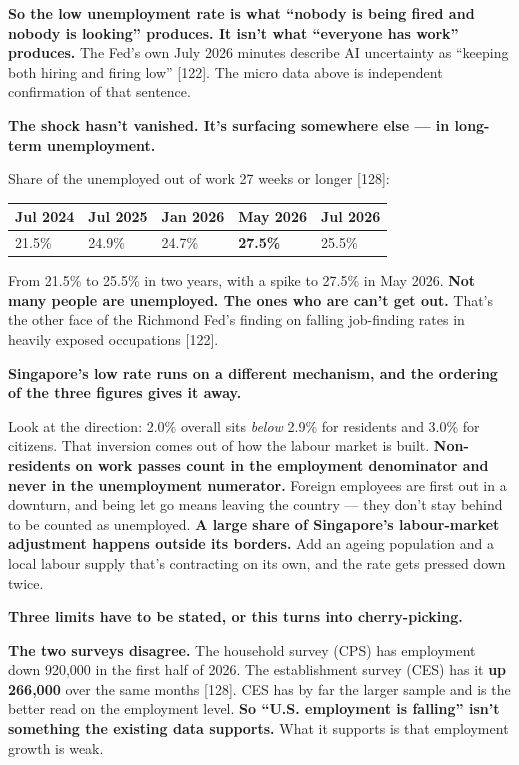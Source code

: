 \documentclass[11pt,a4paper]{article}
\begin{document}
\textbf{So the low unemployment rate is what ``nobody is being fired and nobody is looking'' produces. It isn't what ``everyone has work'' produces.} The Fed's own July 2026 minutes describe AI uncertainty as ``keeping both hiring and firing low'' [122]. The micro data above is independent confirmation of that sentence.

\textbf{The shock hasn't vanished. It's surfacing somewhere else --- in long-term unemployment.}

Share of the unemployed out of work 27 weeks or longer [128]:

\begin{center}
\small
\begin{tabularx}{\textwidth}{lXXXX}
\toprule
Jul 2024 & Jul 2025 & Jan 2026 & May 2026 & Jul 2026 \\
\midrule
21.5\% & 24.9\% & 24.7\% & \textbf{27.5\%} & 25.5\% \\
\bottomrule
\end{tabularx}
\end{center}

From 21.5\% to 25.5\% in two years, with a spike to 27.5\% in May 2026. \textbf{Not many people are unemployed. The ones who are can't get out.} That's the other face of the Richmond Fed's finding on falling job-finding rates in heavily exposed occupations [122].

\textbf{Singapore's low rate runs on a different mechanism, and the ordering of the three figures gives it away.}

Look at the direction: 2.0\% overall sits \textit{below} 2.9\% for residents and 3.0\% for citizens. That inversion comes out of how the labour market is built. \textbf{Non-residents on work passes count in the employment denominator and never in the unemployment numerator.} Foreign employees are first out in a downturn, and being let go means leaving the country --- they don't stay behind to be counted as unemployed. \textbf{A large share of Singapore's labour-market adjustment happens outside its borders.} Add an ageing population and a local labour supply that's contracting on its own, and the rate gets pressed down twice.

\textbf{Three limits have to be stated, or this turns into cherry-picking.}

\textbf{The two surveys disagree.} The household survey (CPS) has employment down 920,000 in the first half of 2026. The establishment survey (CES) has it \textbf{up 266,000} over the same months [128]. CES has by far the larger sample and is the better read on the employment level. \textbf{So ``U.S. employment is falling'' isn't something the existing data supports.} What it supports is that employment growth is weak.
\end{document}
